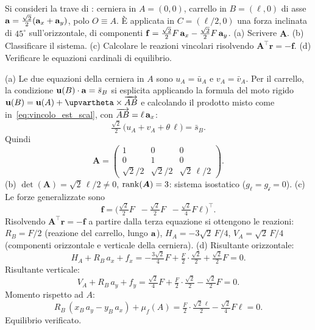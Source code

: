 \begin{esercizio}
	\label{ex:C05_trave_inclinata_stat}
	
	Si consideri la trave di :
	cerniera in $A=(0,0)$, carrello in $B=(\ell,0)$ di asse
	$\mathbf{a}=\tfrac{\sqrt{2}}{2}(\mathbf{a}_x+\mathbf{a}_y)$, polo $O\equiv A$.
	È applicata in $C=(\ell/2,0)$ una forza inclinata di
	$45^\circ$ sull'orizzontale, di componenti
	$\mathbf{f}=\tfrac{\sqrt{2}}{2}F\,\mathbf{a}_x-\tfrac{\sqrt{2}}{2}F\,\mathbf{a}_y$.
	(a) Scrivere $\bm{A}$. (b) Classificare il sistema.
	(c) Calcolare le reazioni vincolari risolvendo
	$\bm{A}^\top\bm{r}=-\bm{f}$.
	(d) Verificare le equazioni cardinali di equilibrio.
	
	\risultato (a) Le due equazioni della cerniera in $A$ sono
	$u_A=\bar{u}_A$ e $v_A=\bar{v}_A$. Per il carrello, la
	condizione $\mathbf{u}(B)\cdot\mathbf{a}=\bar{s}_B$ si esplicita applicando
	la formula del moto rigido $\ub(B)=\ub(A)+\bm{\upvartheta}\times
	\overrightarrow{AB}$ e calcolando il prodotto misto come
	in~\eqref{eq:vincolo_est_scal}, con $\overrightarrow{AB}=\ell\,\mathbf{a}_x$:
	\[
	\tfrac{\sqrt{2}}{2}\,\bigl(u_A+v_A+\theta\,\ell\bigr)
	=\bar{s}_B.
	\]
	Quindi
	\[
	\bm{A}=
	\begin{pmatrix}
		1 & 0 & 0\\
		0 & 1 & 0\\
		\sqrt{2}/2 & \sqrt{2}/2 & \sqrt{2}\,\ell/2
	\end{pmatrix}.
	\]
	(b) $\det(\bm{A})=\sqrt{2}\,\ell/2\neq 0$, $\operatorname{rank}(\bm{A})=3$:
	sistema isostatico ($g_\ell=g_{\mathscr{i}}=0$).
	(c) Le forze generalizzate sono
	\[
	\bm{f}=\bigl(\tfrac{\sqrt{2}}{2}F\;\;
	-\tfrac{\sqrt{2}}{2}F\;\;
	-\tfrac{\sqrt{2}}{4}F\ell\bigr)^\top.
	\]
	Risolvendo $\bm{A}^\top\bm{r}=-\bm{f}$ a partire dalla terza
	equazione si ottengono le reazioni: $R_B=F/2$ (reazione del
	carrello, lungo $\mathbf{a}$), $H_A=-3\sqrt{2}\,F/4$,
	$V_A=\sqrt{2}\,F/4$ (componenti orizzontale e verticale della
	cerniera).
	(d) Risultante orizzontale:
	\[
	H_A+R_B\,a_x+f_x
	=-\tfrac{3\sqrt{2}}{4}F+\tfrac{F}{2}\cdot\tfrac{\sqrt{2}}{2}
	+\tfrac{\sqrt{2}}{2}F=0.
	\]
	Risultante verticale:
	\[
	V_A+R_B\,a_y+f_y
	=\tfrac{\sqrt{2}}{4}F+\tfrac{F}{2}\cdot\tfrac{\sqrt{2}}{2}
	-\tfrac{\sqrt{2}}{2}F=0.
	\]
	Momento rispetto ad $A$:
	\[
	R_B\,(x_B\,a_y - y_B\,a_x) + \mu_f(A)
	=\tfrac{F}{2}\cdot\tfrac{\sqrt{2}\,\ell}{2}
	-\tfrac{\sqrt{2}}{4}F\ell=0.
	\]
	Equilibrio verificato.
\end{esercizio}

